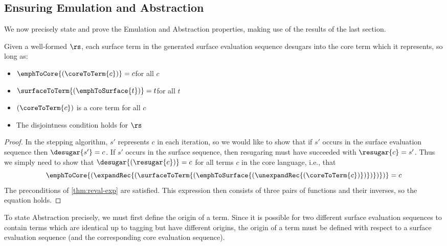 \subsection{Ensuring Emulation and Abstraction}
\label{sec:reval-proofs}

We now precisely state and prove the Emulation and Abstraction properties,
making use of the results of the last section.

\begin{thm}[Emulation]
\label{thm:reval-emulation}
Given a well-formed {} $\rs$,
each surface term in the generated surface evaluation sequence desugars
into the core term which it represents, so long as:
\begin{itemize}
\item $\emphToCore{(\coreToTerm{c})} = c$\quad for all $c$
\item $\surfaceToTerm{(\emphToSurface{t})} = t$\quad for all $t$
\item $(\coreToTerm{c})$ is a core term for all $c$
\item The disjointness condition holds for $\rs$
\end{itemize}
\end{thm}
\begin{proof}
In the stepping algorithm, $s'$ represents $c$ in each iteration, so we
would like to show that if $s'$ occurs in the surface evaluation sequence
then $\desugar{s'} = c$. If $s'$ occurs in the surface sequence, then
resugaring must have succeeded with $\resugar{c} = s'$. Thus we simply
need to show that $\desugar{(\resugar{c})} = c$ for all terms $c$ in the
core language, i.e., that
\[\emphToCore{(\expandRec{(\surfaceToTerm{(
    \emphToSurface{(\unexpandRec{(\coreToTerm{c})})})})})} = c\]
The preconditions of \cref{thm:reval-exp} are satisfied. This
expression then consists of three pairs of functions and their inverses,
so the equation holds.
\end{proof}

To state Abstraction precisely, we must first define the origin of a term.
Since it is possible for two different surface evaluation sequences to
contain terms which are identical up to tagging but have different
origins, the origin of a term must be defined with respect to a surface
evaluation sequence (and the corresponding core evaluation sequence).

